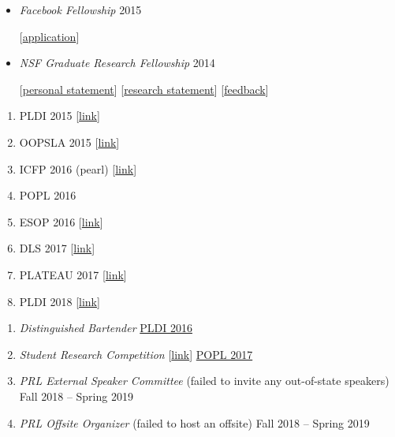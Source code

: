\documentclass{article}
\begin{document}



\begin{itemize}
\item \emph{Facebook Fellowship} \hfill 2015
\item[] [\href{http://ccs.neu.edu/home/types/cv/failures/facebook-2015-reject.pdf}{application}]
\item \emph{NSF Graduate Research Fellowship} \hfill 2014
\item[] [\href{http://ccs.neu.edu/home/types/cv/failures/nsf-2014-personal-reject.pdf}{personal statement}]
        [\href{http://ccs.neu.edu/home/types/cv/failures/nsf-2014-research-reject.pdf}{research statement}]
        [\href{http://ccs.neu.edu/home/types/cv/failures/nsf-2014-reject-response.pdf}{feedback}]
\end{itemize}



\begin{enumerate}
\item PLDI 2015 [\href{http://ccs.neu.edu/home/types/cv/failures/pldi-2015-reject.pdf}{link}]
\item OOPSLA 2015 [\href{http://ccs.neu.edu/home/types/cv/failures/oopsla-2015-reject.pdf}{link}]
\item ICFP 2016 (pearl) [\href{http://ccs.neu.edu/home/types/cv/failures/icfp-2016-reject.pdf}{link}]
\item POPL 2016
\item ESOP 2016 [\href{http://ccs.neu.edu/home/types/resources/type-tailoring.pdf}{link}]
\item DLS 2017 [\href{http://ccs.neu.edu/home/types/resources/dls-2017-reject.pdf}{link}]
\item PLATEAU 2017 [\href{http://ccs.neu.edu/home/types/cv/failures/plateau-2017-reject.pdf}{link}]
\item PLDI 2018 [\href{http://ccs.neu.edu/home/types/cv/failures/pldi-2018-reject.pdf}{link}]
\end{enumerate}

\begin{enumerate}
\item \emph{Distinguished Bartender} \hfill \href{http://conf.researchr.org/home/PLDI-2016}{PLDI 2016}
\item \emph{Student Research Competition} [\href{http://ccs.neu/home/types/cv/failures/src-2017-reject.pdf}{link}] \hfill \href{https://popl17.sigplan.org/track/POPL-2017-src}{POPL 2017}
\item \emph{PRL External Speaker Committee} (failed to invite any out-of-state speakers)  \hfill {Fall 2018 -- Spring 2019}
\item \emph{PRL Offsite Organizer} (failed to host an offsite) \hfill {Fall 2018 -- Spring 2019}
\end{enumerate}
\end{document}
